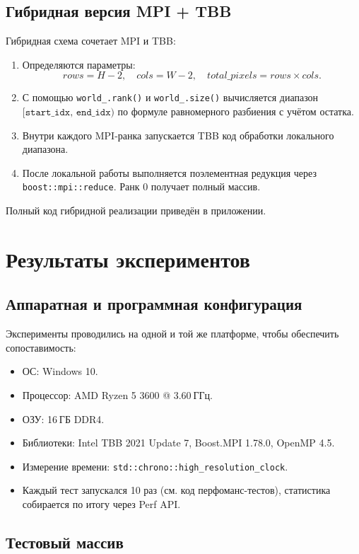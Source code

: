 \documentclass[12pt]{article}
\begin{document}
\subsection{Гибридная версия MPI + TBB}

Гибридная схема сочетает MPI и TBB:
\begin{enumerate}
    \item Определяются параметры:
    \[
        rows = H - 2,\quad cols = W - 2,\quad total\_pixels = rows \times cols.
    \]
    \item С помощью \texttt{world\_.rank()} и \texttt{world\_.size()} вычисляется диапазон \([\texttt{start\_idx},\,\texttt{end\_idx})\) по формуле равномерного разбиения с учётом остатка.
    \item Внутри каждого MPI-ранка запускается TBB код
    обработки локального диапазона.  
    \item После локальной работы выполняется поэлементная редукция через \texttt{boost::mpi::reduce}. Ранк 0 получает полный массив.
\end{enumerate}
Полный код гибридной реализации приведён в приложении.

\section{Результаты экспериментов}

\subsection{Аппаратная и программная конфигурация}

Эксперименты проводились на одной и той же платформе, чтобы обеспечить сопоставимость:
\begin{itemize}
    \item ОС: Windows 10.
    \item Процессор: AMD Ryzen 5 3600 @ 3.60 ГГц.
    \item ОЗУ: 16 ГБ DDR4.
    \item Библиотеки: Intel TBB 2021 Update 7, Boost.MPI 1.78.0, OpenMP 4.5.
    \item Измерение времени: \texttt{std::chrono::high\_resolution\_clock}.
    \item Каждый тест запускался 10 раз (см. код перфоманс-тестов), статистика собирается по итогу через Perf API.
\end{itemize}

\subsection{Тестовый массив}
\end{document}
